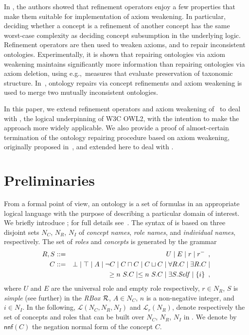 \documentclass[
]{ceurart}
\begin{document}
In \cite{troquard2018repairing}, the authors showed that refinement operators enjoy a few properties that make them suitable for implementation of axiom weakening. In particular, deciding whether a concept is a refinement of another concept has the same worst-case complexity as deciding concept subsumption in the underlying logic. Refinement operators are then used to weaken axioms, and to repair inconsistent ontologies. Experimentally, it is shown that repairing ontologies via axiom weakening maintains significantly more information than repairing ontologies via axiom deletion, using e.g.,\ measures that evaluate preservation of taxonomic structure. In~\cite{porello2018two}, ontology repairs via concept refinements and axiom weakening is used to merge two mutually inconsistent ontologies.

In this paper, we extend refinement operators and axiom weakening of~\cite{troquard2018repairing} to deal with \SROIQ, the logical underpinning of W3C OWL2, with the intention to make the approach more widely applicable. We also provide a proof of almost-certain termination of the ontology repairing procedure based on axiom weakening, originally proposed in~\cite{troquard2018repairing}, and extended here to deal with \SROIQ. %
%


\section{Preliminaries}
From a formal point of view, an ontology is a set of formulas in an appropriate logical language with the purpose of describing a particular domain of interest. 
%
We briefly introduce \SROIQ; for full details see~\cite{baader_horrocks_lutz_sattler_2017}. 
%
The syntax of \SROIQ is based on three disjoint sets $N_C$, $N_R$, $N_I$ of \emph{concept names}, \emph{role names}, and \emph{individual names}, respectively.
%
The set of \SROIQ \emph{roles} and \emph{concepts} is generated by the grammar 
\begin{eqnarray*}
R, S & ::= & U \mid E \mid r \mid r^{-} \enspace,\\
C & ::= & \bot \mid \top \mid A\mid \neg C\mid C\sqcap C\mid C\sqcup C\mid \forall R.C\mid \exists R.C 
\mid \\ 
& & \geq n~S.C \mid \leq n~S.C \mid \exists S.\mathit{Self} \mid \{i\} \enspace,
\end{eqnarray*}
where $U$ and $E$ are the universal role and empty role respectively,
$r \in N_R$, $S$ is \emph{simple} (see further) in the {\em RBox} $\mathcal{R}$, $A\in N_C$, $n$ is a non-negative integer, and $i \in N_I$.
%
In the following, $\mathcal{L}(N_C, N_R, N_I)$ and $\mathcal{L}_r(N_R)$, denote respectively the set of concepts and roles that can be built over $N_C$, $N_R$, $N_I$ in \SROIQ.
We denote by $\mathsf{nnf}(C)$ the negation normal form of the concept $C$.
\end{document}
